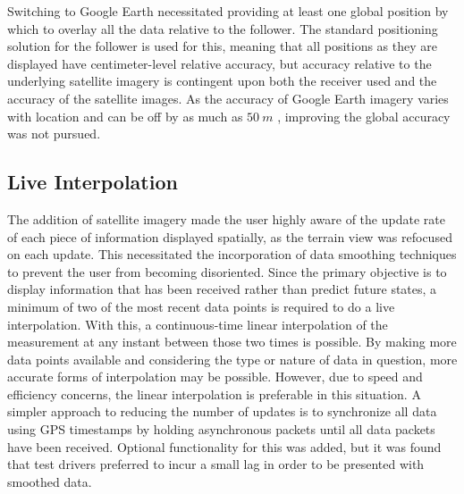 \documentclass[twocolumn,10pt]{article}
\begin{document}
    Switching to Google Earth necessitated providing at least one global position by which to overlay all the data relative to the follower.  The standard positioning solution for the follower is used for this, meaning that all positions as they are displayed have centimeter-level relative accuracy, but accuracy relative to the underlying satellite imagery is contingent upon both the receiver used and the accuracy of the satellite images.  As the accuracy of Google Earth imagery varies with location and can be off by as much as $50~m$ \cite{ge_accuracy}, improving the global accuracy was not pursued.


  \subsection*{Live Interpolation}

    The addition of satellite imagery made the user highly aware of the update rate of each piece of information displayed spatially, as the terrain view was refocused on each update.  This necessitated the incorporation of data smoothing techniques to prevent the user from becoming disoriented.
    Since the primary objective is to display information that has been received rather than predict future states, a minimum of two of the most recent data points is required to do a live interpolation.  With this, a continuous-time linear interpolation of the measurement at any instant between those two times is possible.  By making more data points available and considering the type or nature of data in question, more accurate forms of interpolation may be possible. However, due to speed and efficiency concerns, the linear interpolation is preferable in this situation.
    A simpler approach to reducing the number of updates is to synchronize all data using GPS timestamps by holding asynchronous packets until all data packets have been received.  Optional functionality for this was added, but it was found that test drivers preferred to incur a small lag in order to be presented with smoothed data.
    
\end{document}
